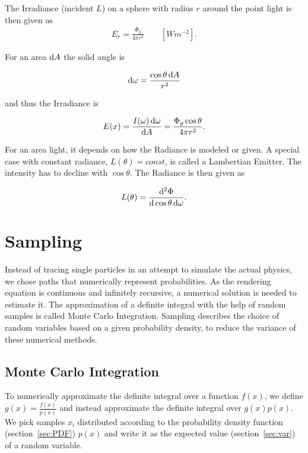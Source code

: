 The Irradiance (incident $L$) on a sphere with radius $r$ around the point light is then given as
\begin{align}
E_r =  \frac{\Phi_g}{4\pi r^2} \qquad [ W m^{-2} ] .
\end{align}

For an area $\mathop{}\!\mathrm{d} A$ the solid angle is 

\begin{align}
\mathop{}\!\mathrm{d} \omega = \frac{\cos \theta \mathop{}\!\mathrm{d} A}{r^2}  
\end{align}


and thus the Irradiance is

\begin{align}
E(x) = \frac{ I(\omega) \mathop{}\!\mathrm{d} \omega }{ \mathop{}\!\mathrm{d} A } = \frac{ \Phi_g \cos \theta }{ 4 \pi r^2}.
\end{align}

For an area light, it depends on how the Radiance is modeled or given. A special case with constant radiance, $L(\theta) = const$, is called a Lambertian Emitter. The intensity has to decline with $\cos\theta$. The Radiance is then given as 

\begin{align}
L(\theta) = \frac{\mathop{}\!\mathrm{d}^2\Phi}{\mathop{}\!\mathrm{d}\cos\theta\mathop{}\!\mathrm{d}\omega}.
\end{align}



\section{Sampling}

Instead of tracing single particles in an attempt to simulate the actual physics, we chose paths that numerically represent probabilities. As the rendering equation is continuous and infinitely recursive, a numerical solution is needed to estimate it. The approximation of a definite integral with the help of random samples is called Monte Carlo Integration. Sampling describes the choice of random variables based on a given probability density, to reduce the variance of these numerical methods.

\subsection{Monte Carlo Integration}
\label{sec:montecarlo}
\label{sec:MC}

To numerically approximate the definite integral over a function $f(x)$, we define $g(x) = \frac{f(x)}{p(x)}$ and instead approximate the definite integral over $g(x)p(x)$. We pick samples $x_i$ distributed according to the probability density function (section~\ref{sec:PDF}) $p(x)$ and write it as the expected value (section~\ref{sec:var}) of a random variable.

